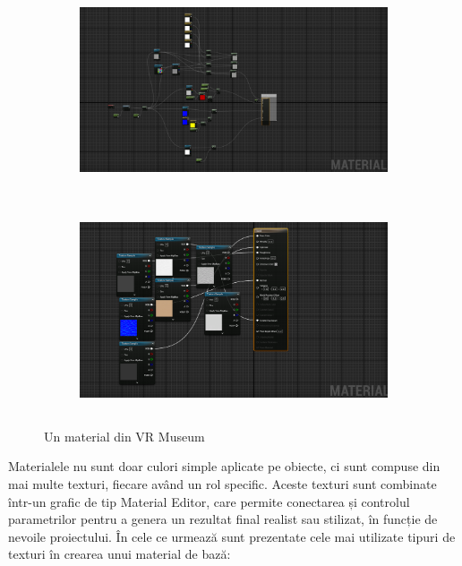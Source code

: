 \begin{figure}[h!]
    \centering
    \begin{subfigure}{0.49\textwidth}
        \includegraphics[width=\linewidth, height=6cm]{continut/capitol3/figuri/material.png}
        \label{fig:Terrain mapping}
    \end{subfigure}
    \hfill
    \begin{subfigure}{0.49\textwidth}
        \includegraphics[width=\linewidth, height=6cm]{continut/capitol3/figuri/ez_mat.png}
        \label{fig:Terrain mapping}
    \end{subfigure}
    \caption{Un material din VR Museum}
\end{figure}

Materialele nu sunt doar culori simple aplicate pe obiecte, ci sunt compuse din mai multe texturi, fiecare având un rol specific. Aceste texturi sunt combinate într-un grafic de tip Material Editor, care permite conectarea și controlul parametrilor pentru a genera un rezultat final realist sau stilizat, în funcție de nevoile proiectului. În cele ce urmează sunt prezentate cele mai utilizate tipuri de texturi în crearea unui material de bază:

